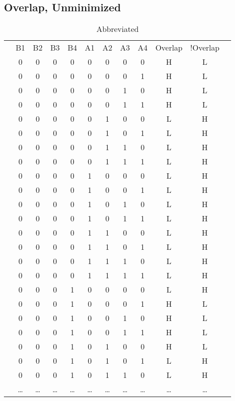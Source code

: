\documentclass[letterpaper,titlepage,oneside]{article}
\begin{document}
\subsection*{Overlap, Unminimized}
\begin{table}['h']
\begin{tabular}{c|c|c|c|c|c|c|c|c|c|c|c}
\cline{2-11}

 & B1 & B2 & B3 & B4 & A1 & A2 & A3 & A4 & Overlap & !Overlap & \\ \cline{2-11}
 & 0 & 0 & 0 & 0 & 0 & 0 & 0 & 0 & H & L &   \\
 & 0 & 0 & 0 & 0 & 0 & 0 & 0 & 1 & H & L &   \\
 & 0 & 0 & 0 & 0 & 0 & 0 & 1 & 0 & H & L &   \\
 & 0 & 0 & 0 & 0 & 0 & 0 & 1 & 1 & H & L &   \\
 & 0 & 0 & 0 & 0 & 0 & 1 & 0 & 0 & L & H &   \\
 & 0 & 0 & 0 & 0 & 0 & 1 & 0 & 1 & L & H &   \\
 & 0 & 0 & 0 & 0 & 0 & 1 & 1 & 0 & L & H &   \\
 & 0 & 0 & 0 & 0 & 0 & 1 & 1 & 1 & L & H &   \\
 & 0 & 0 & 0 & 0 & 1 & 0 & 0 & 0 & L & H &   \\
 & 0 & 0 & 0 & 0 & 1 & 0 & 0 & 1 & L & H &   \\
 & 0 & 0 & 0 & 0 & 1 & 0 & 1 & 0 & L & H &   \\
 & 0 & 0 & 0 & 0 & 1 & 0 & 1 & 1 & L & H &   \\
 & 0 & 0 & 0 & 0 & 1 & 1 & 0 & 0 & L & H &   \\
 & 0 & 0 & 0 & 0 & 1 & 1 & 0 & 1 & L & H &   \\
 & 0 & 0 & 0 & 0 & 1 & 1 & 1 & 0 & L & H &   \\
 & 0 & 0 & 0 & 0 & 1 & 1 & 1 & 1 & L & H &   \\
 & 0 & 0 & 0 & 1 & 0 & 0 & 0 & 0 & L & H &   \\
 & 0 & 0 & 0 & 1 & 0 & 0 & 0 & 1 & H & L &   \\
 & 0 & 0 & 0 & 1 & 0 & 0 & 1 & 0 & H & L &   \\
 & 0 & 0 & 0 & 1 & 0 & 0 & 1 & 1 & H & L &   \\
 & 0 & 0 & 0 & 1 & 0 & 1 & 0 & 0 & H & L &   \\
 & 0 & 0 & 0 & 1 & 0 & 1 & 0 & 1 & L & H &   \\
 & 0 & 0 & 0 & 1 & 0 & 1 & 1 & 0 & L & H &   \\
 & \ldots & \ldots & \ldots & \ldots & \ldots & \ldots & \ldots & \ldots & \ldots & \ldots &  \\

\cline{2-11}
\end{tabular}
\caption{Abbreviated}\label{table:OverLap_Unminimized}
\end{table}
\end{document}
